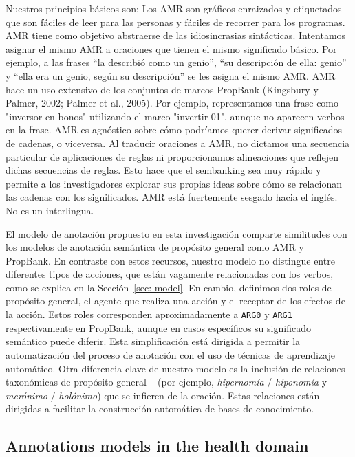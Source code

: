 Nuestros principios básicos son:
Los AMR son gráficos enraizados y etiquetados que son fáciles de leer para las personas y fáciles de recorrer para los programas.
AMR tiene como objetivo abstraerse de las idiosincrasias sintácticas. Intentamos asignar el
mismo AMR a oraciones que tienen el mismo significado básico. Por ejemplo, a las frases “la describió como un genio”, “su descripción de ella: genio” y “ella era un genio, según su descripción” se les asigna el mismo AMR.
AMR hace un uso extensivo de los conjuntos de marcos PropBank (Kingsbury y Palmer, 2002; Palmer et al., 2005). Por ejemplo, representamos una frase como "inversor en bonos" utilizando el marco "invertir-01", aunque no aparecen verbos en la frase.
AMR es agnóstico sobre cómo podríamos querer derivar significados de cadenas, o viceversa. Al traducir oraciones a AMR, no dictamos una secuencia particular de aplicaciones de reglas ni proporcionamos alineaciones que reflejen dichas secuencias de reglas. Esto hace que el sembanking sea muy rápido y permite a los investigadores explorar sus propias ideas sobre cómo se relacionan las cadenas con los significados.
AMR está fuertemente sesgado hacia el inglés. No es un interlingua.

El modelo de anotación propuesto en esta investigación comparte similitudes con los modelos de anotación semántica de propósito general como AMR y PropBank.
En contraste con estos recursos, nuestro modelo no distingue entre diferentes tipos de acciones, que están vagamente relacionadas con los verbos, como se explica en la Sección~\ref{sec: model}. En cambio, definimos dos roles de propósito general, el agente que realiza una acción y el receptor de los efectos de la acción. Estos roles corresponden aproximadamente a \texttt{ARG0} y \texttt{ARG1} respectivamente en PropBank, aunque en casos específicos su significado semántico puede diferir.
Esta simplificación está dirigida a permitir la automatización del proceso de anotación con el uso de técnicas de aprendizaje automático.
Otra diferencia clave de nuestro modelo es la inclusión de relaciones taxonómicas de propósito general ~ (por ejemplo, \textit{hipernomía} / \textit{hiponomía} y \textit{merónimo} / \textit{holónimo}) que se infieren de la oración. Estas relaciones están dirigidas a facilitar la construcción automática de bases de conocimiento.

\subsection{Annotations models in the health domain}\label{sec:health}

